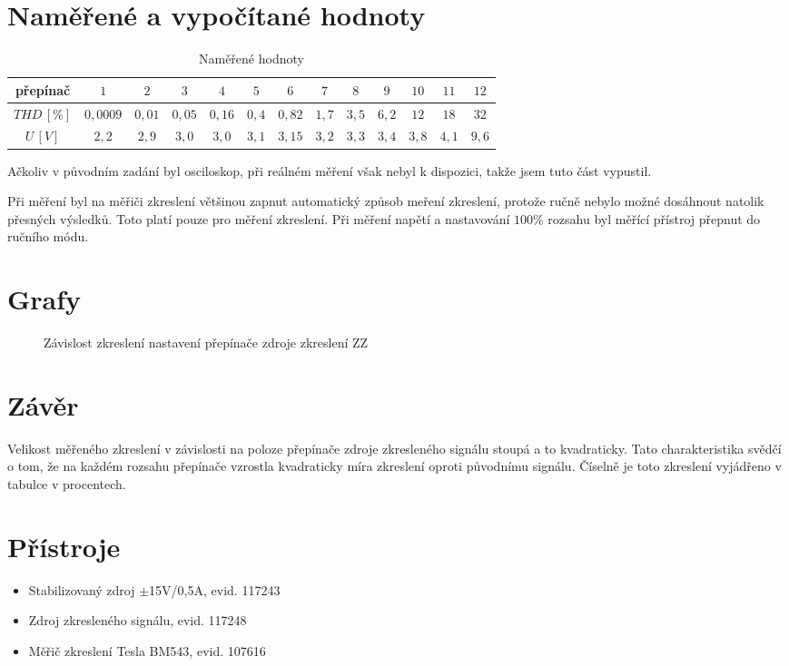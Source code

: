 \documentclass[12pt]{article} %
\begin{document}
\section{Naměřené a vypočítané hodnoty}
\begin{table}[H]
\caption{Naměřené hodnoty}
\begin{tabular}{|c|c|c|c|c|c|c|c|c|c|c|c|c|}
\hline 
přepínač & $1$ & $2$ & $3$ & $4$ & $5$ & $6$ & $7$ & $8$ & $9$ & $10$ & $11$ & $12$ \\ 
\hline 
$THD\,[\%]$ & $0,0009$ & $0,01$ & $0,05$ & $0,16$ & $0,4$ & $0,82$ & $1,7$ & $3,5$ & $6,2$ & $12$ & $18$ & $32$ \\ 
\hline 
$U\,[V]$ & $2,2$ & $2,9$ & $3,0$ & $3,0$ & $3,1$ & $3,15$ & $3,2$ & $3,3$ & $3,4$ & $3,8$ & $4,1$ & $9,6$ \\ 
\hline 
\end{tabular} 
\end{table}

Ačkoliv v původním zadání byl osciloskop, při reálném měření však nebyl k dispozici, takže jsem tuto část vypustil.

Při měření byl na měřiči zkreslení většinou zapnut automatický způsob meření zkreslení, protože ručně nebylo možné dosáhnout natolik přesných výsledků. Toto platí pouze pro měření zkreslení. Při měření napětí a nastavování $100\%$ rozsahu byl měřící přístroj přepnut do ručního módu.

\section{Grafy}
\begin{figure}[H]
\centering
	\caption{Závislost zkreslení nastavení přepínače zdroje zkreslení ZZ}
\end{figure}

\section{Závěr}
Velikost měřeného zkreslení v závislosti na poloze přepínače zdroje zkresleného signálu stoupá a to kvadraticky. Tato charakteristika svědčí o tom, že na každém rozsahu přepínače vzrostla kvadraticky míra zkreslení oproti původnímu signálu. Číselně je toto zkreslení vyjádřeno v tabulce v procentech.

\section{Přístroje}
\begin{itemize}
\item Stabilizovaný zdroj $\pm$15V/0,5A, evid. 117243
\item Zdroj zkresleného signálu, evid. 117248
\item Měřič zkreslení Tesla BM543, evid. 107616
\end{itemize}
\end{document}
